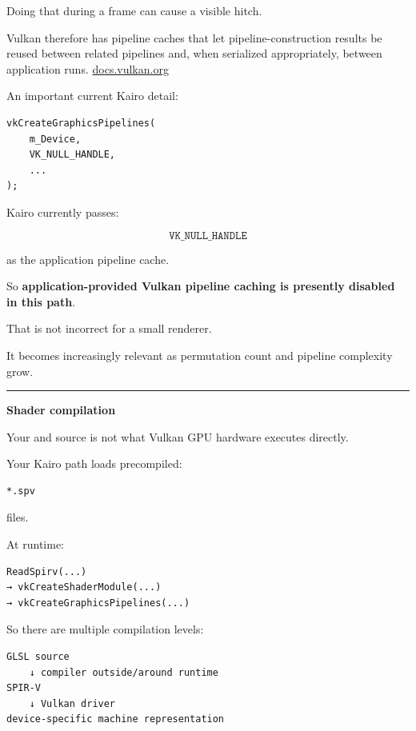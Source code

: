 Doing that during a frame can cause a visible hitch.

Vulkan therefore has pipeline caches that let pipeline-construction results be reused between related pipelines and, when serialized appropriately, between application runs. \href{https://docs.vulkan.org/spec/latest/chapters/pipelines.html?utm_source=chatgpt.com}{docs.vulkan.org}

An important current Kairo detail:

\begin{verbatim}
vkCreateGraphicsPipelines(
    m_Device,
    VK_NULL_HANDLE,
    ...
);
\end{verbatim}

Kairo currently passes:

\[
\boxed{\texttt{VK\_NULL\_HANDLE}}
\]

as the application pipeline cache.

So \textbf{application-provided Vulkan pipeline caching is presently disabled in this path}.

That is not incorrect for a small renderer.

It becomes increasingly relevant as permutation count and pipeline complexity grow.

\begin{center}\rule{0.5\linewidth}{0.5pt}\end{center}

\textbf{Shader compilation}

Your  and  source is not what Vulkan GPU hardware executes directly.

Your Kairo path loads precompiled:

\begin{verbatim}
*.spv
\end{verbatim}

files.

At runtime:

\begin{verbatim}
ReadSpirv(...)
→ vkCreateShaderModule(...)
→ vkCreateGraphicsPipelines(...)
\end{verbatim}

So there are multiple compilation levels:

\begin{verbatim}
GLSL source
    ↓ compiler outside/around runtime
SPIR-V
    ↓ Vulkan driver
device-specific machine representation
\end{verbatim}

